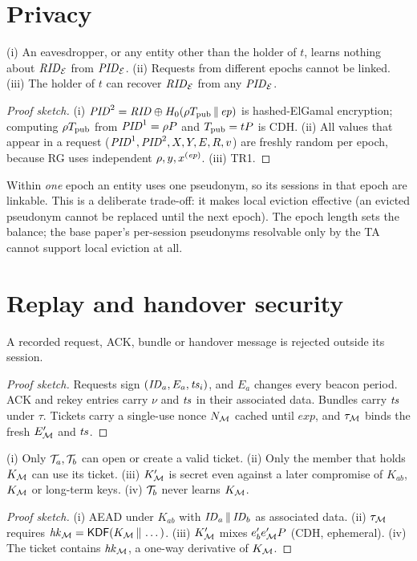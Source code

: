 \section{Privacy}
\begin{theorem}\label{thm:priv}
(i) An eavesdropper, or any entity other than the holder of $t$, learns nothing about $\mathit{RID}_{\mathcal{E}}$ from $\mathit{PID}_{\mathcal{E}}$. (ii) Requests from different epochs cannot be linked.
(iii) The holder of $t$ can recover $\mathit{RID}_{\mathcal{E}}$ from any $\mathit{PID}_{\mathcal{E}}$.
\end{theorem}
\begin{proof}[Proof sketch]
(i) $\mathit{PID}^2=\mathit{RID}\oplus H_0(\rho T_{\mathrm{pub}}\,\|\,\mathit{ep})$ is hashed-ElGamal encryption; computing $\rho T_{\mathrm{pub}}$ from $\mathit{PID}^1=\rho P$ and $T_{\mathrm{pub}}=tP$ is CDH. (ii) All
values that appear in a request ($\mathit{PID}^1,\mathit{PID}^2,X,Y,E,R,v$) are freshly random per epoch, because RG uses independent $\rho,y,x^{(\mathit{ep})}$. (iii) TR1.
\end{proof}
\begin{limitbox}
Within \emph{one} epoch an entity uses one pseudonym, so its sessions in that epoch are linkable. This is a deliberate trade-off: it makes local
eviction effective (an evicted pseudonym cannot be replaced until the next epoch). The epoch length sets the balance; the base paper's per-session pseudonyms
resolvable only by the TA cannot support local eviction at all.
\end{limitbox}

\section{Replay and handover security}
\begin{theorem}\label{thm:replay}
A recorded request, ACK, bundle or handover message is rejected outside its session.
\end{theorem}
\begin{proof}[Proof sketch]
Requests sign $(\mathit{ID}_a,E_a,\mathit{ts}_i)$, and $E_a$ changes every beacon period. ACK and rekey entries carry $\nu$ and $\mathit{ts}$ in their associated data. Bundles carry $\mathit{ts}$ under
$\tau$. Tickets carry a single-use nonce $N_{\mathcal{M}}$ cached until $\mathit{exp}$, and $\tau_{\mathcal{M}}$ binds the fresh $E'_{\mathcal{M}}$ and $\mathit{ts}$.
\end{proof}
\begin{theorem}[Handover]\label{thm:ho}
(i) Only $\mathcal{T}_a,\mathcal{T}_b$ can open or create a valid ticket. (ii) Only the member that holds $K_{\mathcal{M}}$ can use its ticket. (iii) $K'_{\mathcal{M}}$ is secret even against a later compromise
of $K_{ab}$, $K_{\mathcal{M}}$ or long-term keys. (iv) $\mathcal{T}_b$ never learns $K_{\mathcal{M}}$.
\end{theorem}
\begin{proof}[Proof sketch]
(i) AEAD under $K_{ab}$ with $\mathit{ID}_a\,\|\,\mathit{ID}_b$ as associated data. (ii) $\tau_{\mathcal{M}}$ requires $\mathit{hk}_{\mathcal{M}}=\mathsf{KDF}(K_{\mathcal{M}}\,\|\,\dots)$. (iii) $K'_{\mathcal{M}}$ mixes $e'_be'_{\mathcal{M}} P$ (CDH, ephemeral).
(iv) The ticket contains $\mathit{hk}_{\mathcal{M}}$, a one-way derivative of $K_{\mathcal{M}}$.
\end{proof}

